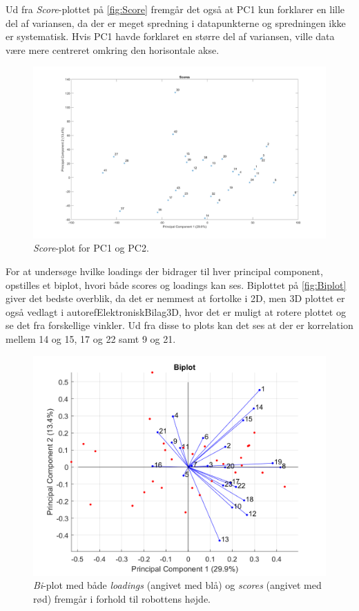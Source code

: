 Ud fra \textit{Score}-plottet på \autoref{fig:Score} fremgår det også at PC1 kun forklarer en lille del af variansen, da der er meget spredning i datapunkterne og spredningen ikke er systematisk. Hvis PC1 havde forklaret en større del af variansen, ville data være mere centreret omkring den horisontale akse.
%
\begin{figure}[H]
\centering
\includegraphics[width=\textwidth]{Figure/DatabehandlingSkalaer/PCAfigures/Scores}
\caption{\textit{Score}-plot for PC1 og PC2.}
\label{fig:Score}
\end{figure}
\noindent
%
For at undersøge hvilke loadings der bidrager til hver principal component, opstilles et biplot, hvori både scores og loadings kan ses. Biplottet på \autoref{fig:Biplot} giver det bedste overblik, da det er nemmest at fortolke i 2D, men 3D plottet er også vedlagt i autoref{ElektroniskBilag3D}, hvor det er muligt at rotere plottet og se det fra forskellige vinkler. Ud fra disse to plots kan det ses at der er korrelation mellem 14 og 15, 17 og 22 samt 9 og 21.
%
\begin{figure}[H]
\centering
\includegraphics[width=\textwidth]{Figure/DatabehandlingSkalaer/PCAfigures/Biplot}
\caption{\textit{Bi}-plot med både \textit{loadings} (angivet med blå) og \textit{scores} (angivet med rød) fremgår i forhold til robottens højde.}
\label{fig:Biplot}
\end{figure}

